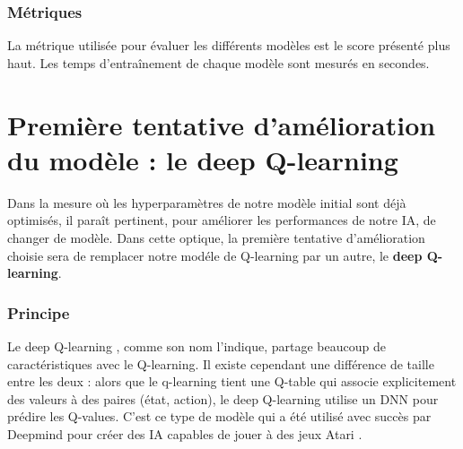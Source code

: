 \documentclass[french]{article}
\begin{document}
    \subsubsection{Métriques}

    La métrique utilisée pour évaluer les différents modèles est le score présenté plus haut. Les temps d'entraînement de chaque modèle sont mesurés en secondes. 

    \section{Première tentative d'amélioration du modèle : le deep Q-learning}

    Dans la mesure où les hyperparamètres de notre modèle initial sont déjà optimisés, il paraît pertinent, pour améliorer les performances de notre IA, de changer de modèle. Dans cette optique, la première tentative d'amélioration choisie sera de remplacer notre modéle de Q-learning par un autre, le \textbf{deep Q-learning}.
    \subsubsection{Principe}

    Le deep Q-learning \cite{deep Q-learning}, comme son nom l'indique, partage beaucoup de caractéristiques avec le Q-learning. Il existe cependant une différence de taille entre les deux : alors que le q-learning tient une Q-table qui associe explicitement des valeurs à des paires (état, action), le deep Q-learning utilise un DNN pour prédire les Q-values. C'est ce type de modèle qui a été utilisé avec succès par Deepmind pour créer des IA capables de jouer à des jeux Atari \cite{deepmind}.
\end{document}
